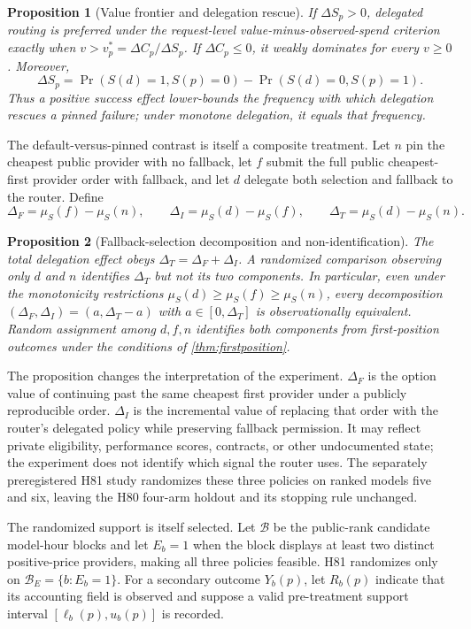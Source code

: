 \documentclass[11pt]{article}
\newtheorem{proposition}{Proposition}
\theoremstyle{definition}
\begin{document}
\begin{proposition}[Value frontier and delegation rescue]
\label{prop:valuefrontier}
If $\Delta S_p>0$, delegated routing is preferred under the request-level
value-minus-observed-spend criterion exactly when
$v>v_p^*=\Delta C_p/\Delta S_p$. If $\Delta C_p\leq0$, it weakly dominates for
every $v\geq0$. Moreover,
\[
 \Delta S_p=\Pr(S(d)=1,S(p)=0)-\Pr(S(d)=0,S(p)=1).
\]
Thus a positive success effect lower-bounds the frequency with which delegation
rescues a pinned failure; under monotone delegation, it equals that frequency.
\end{proposition}

The default-versus-pinned contrast is itself a composite treatment. Let $n$
pin the cheapest public provider with no fallback, let $f$ submit the full
public cheapest-first provider order with fallback, and let $d$ delegate both
selection and fallback to the router. Define
\[
 \Delta_F=\mu_S(f)-\mu_S(n),\qquad
 \Delta_I=\mu_S(d)-\mu_S(f),\qquad
 \Delta_T=\mu_S(d)-\mu_S(n).
\]

\begin{proposition}[Fallback-selection decomposition and non-identification]
\label{prop:decomposition}
The total delegation effect obeys $\Delta_T=\Delta_F+\Delta_I$. A randomized
comparison observing only $d$ and $n$ identifies $\Delta_T$ but not its two
components. In particular, even under the monotonicity restrictions
$\mu_S(d)\geq\mu_S(f)\geq\mu_S(n)$, every decomposition
$(\Delta_F,\Delta_I)=(a,\Delta_T-a)$ with
$a\in[0,\Delta_T]$ is observationally equivalent. Random assignment among
$d,f,n$ identifies both components from first-position outcomes under the
conditions of \cref{thm:firstposition}.
\end{proposition}

The proposition changes the interpretation of the experiment. $\Delta_F$ is
the option value of continuing past the same cheapest first provider under a
publicly reproducible order. $\Delta_I$ is the incremental value of replacing
that order with the router's delegated policy while preserving fallback
permission. It may reflect private eligibility, performance scores, contracts,
or other undocumented state; the experiment does not identify which signal the
router uses. The separately preregistered H81 study randomizes these three
policies on ranked models five and six, leaving the H80 four-arm holdout and its
stopping rule unchanged.

The randomized support is itself selected. Let $\mathcal B$ be the public-rank
candidate model-hour blocks and let $E_b=1$ when the block displays at least two
distinct positive-price providers, making all three policies feasible. H81
randomizes only on $\mathcal B_E=\{b:E_b=1\}$. For a secondary outcome
$Y_b(p)$, let $R_b(p)$ indicate that its accounting field is observed and
suppose a valid pre-treatment support interval
$[\ell_b(p),u_b(p)]$ is recorded.
\end{document}
